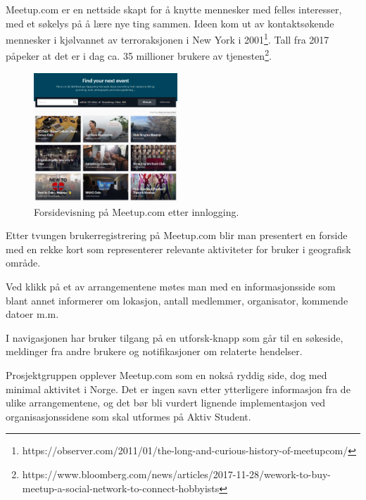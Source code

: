 Meetup.com er en nettside skapt for å knytte mennesker med felles interesser, med et søkelys på å lære nye ting sammen. Ideen kom ut av kontaktsøkende mennesker i kjølvannet av terroraksjonen i New York i 2001\footnote{https://observer.com/2011/01/the-long-and-curious-history-of-meetupcom/}. Tall fra 2017 påpeker at det er i dag ca. 35 millioner brukere av tjenesten\footnote{https://www.bloomberg.com/news/articles/2017-11-28/wework-to-buy-meetup-a-social-network-to-connect-hobbyists}.
\begin{figure}
  \begin{center}
    \includegraphics[width=0.48\textwidth]{Illustrasjoner/andre_platformer/meetup_forside.png}
  \end{center}
  \caption{Forsidevisning på Meetup.com etter innlogging.}
\end{figure}

Etter tvungen brukerregistrering på Meetup.com blir man presentert en forside med en rekke kort som representerer relevante aktiviteter for bruker i geografisk område. 

\vspace{5mm} %

Ved klikk på et av arrangementene møtes man med en informasjonsside som blant annet informerer om lokasjon, antall medlemmer, organisator, kommende datoer m.m.

\vspace{5mm} %

I navigasjonen har bruker tilgang på en utforsk-knapp som går til en søkeside, meldinger fra andre brukere og notifikasjoner om relaterte hendelser.

\vspace{5mm} %

Prosjektgruppen opplever Meetup.com som en nokså ryddig side, dog med minimal aktivitet i Norge. Det er ingen savn etter ytterligere informasjon fra de ulike arrangementene, og det bør bli vurdert lignende implementasjon ved organisasjonssidene som skal utformes på Aktiv Student.

